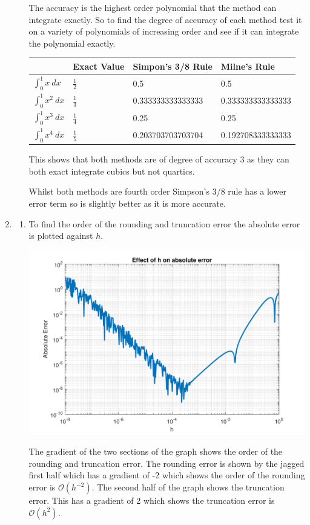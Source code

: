 \documentclass[a4paper,11pt]{article}
\begin{document}
\begin{enumerate}
\begin{enumerate}
		The accuracy is the highest order polynomial that the method can 
		integrate exactly. So to find the degree of accuracy of each method 
		test it on a variety of polynomials of increasing order and see if it 
		can integrate the polynomial exactly.
		
		\begin{center}
			\begin{tabular}{l|lll}
				& Exact Value    & Simpon's 3/8 Rule & Milne's Rule      \\ 
				\hline
				$\int_{0}^{1}x \ dx$     & $\frac{1}{2}$ & 0.5               
				& 0.5               \\
				$\int_{0}^{1}x^{2} \ dx$ & $\frac{1}{3}$ & 0.333333333333333 
				& 0.333333333333333 \\
				$\int_{0}^{1}x^{3} \ dx$ & $\frac{1}{4}$ & 0.25              
				& 0.25              \\
				$\int_{0}^{1}x^{4} \ dx$ & $\frac{1}{5}$ & 0.203703703703704 
				& 0.192708333333333
			\end{tabular}
		\end{center}
		This shows that both methods are of degree of accuracy 3 as they can 
		both exact integrate cubics but not quartics.
		
		Whilst both methods are fourth order Simpson's 3/8 rule has a lower 
		error term so is slightly better as it is more accurate.
	\end{enumerate}

	
	\item \begin{enumerate}
		\item To find the order of the rounding and truncation error the 
		absolute error is plotted against $h$.
		\begin{center}
			\includegraphics[scale=0.7]{images/Q2bi.pdf}
		\end{center}
		The gradient of the two sections of the graph shows the order of the 
		rounding and truncation error. The rounding error is shown by the 
		jagged first half which has a gradient of -2 which shows the order of 
		the rounding error is $\mathcal{O}(h^{-2})$. The second half of the 
		graph shows the truncation error. This has a gradient of 2 which 
		shows the truncation error is $\mathcal{O}(h^{2})$.
		

\end{enumerate}
\end{enumerate}
\end{document}

